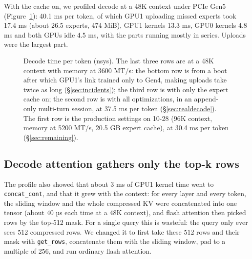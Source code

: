 \documentclass[11pt,a4paper]{article}
\newcommand{\code}[1]{\texttt{#1}}
\begin{document}
With the cache on, we profiled decode at a 48K context under PCIe Gen5 (Figure~\ref{fig:decode}): 40.1 ms per token, of which GPU1 uploading missed experts took 17.4 ms (about 26.5 experts, 474 MiB), GPU1 kernels 13.3 ms, GPU0 kernels 4.8 ms and both GPUs idle 4.5 ms, with the parts running mostly in series. Uploads were the largest part.

\begin{figure}[t]
  \centering
  \caption{Decode time per token (nsys). The last three rows are at a 48K context with memory at 3600 MT/s: the bottom row is from a boot after which GPU1's link trained only to Gen4, making uploads take twice as long (\S\ref{sec:incidents}); the third row is with only the expert cache on; the second row is with all optimizations, in an append-only multi-turn session, at 37.5 ms per token (\S\ref{sec:realdecode}). The first row is the production settings on 10-28 (96K context, memory at 5200 MT/s, 20.5 GB expert cache), at 30.4 ms per token (\S\ref{sec:remaining}).}
  \label{fig:decode}
\end{figure}

\subsection{Decode attention gathers only the top-k rows}
\label{sec:gather}

The profile also showed that about 3 ms of GPU1 kernel time went to \code{concat\_cont}, and that it grew with the context: for every layer and every token, the sliding window and the whole compressed KV were concatenated into one tensor (about 40 µs each time at a 48K context), and flash attention then picked rows by the top-512 mask. For a single query this is wasteful: the query only ever sees 512 compressed rows. We changed it to first take these 512 rows and their mask with \code{get\_rows}, concatenate them with the sliding window, pad to a multiple of 256, and run ordinary flash attention.
\end{document}
